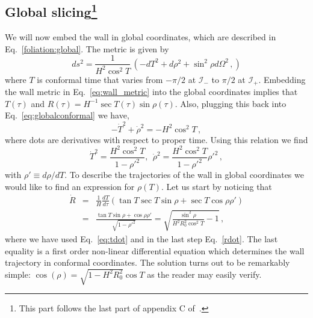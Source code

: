 \documentclass[a4paper,11pt]{article}
\numberwithin{equation}{section}
\begin{document}
\subsection*{Global slicing\footnote{This part follows the last part of appendix C of~\cite{Blau:1986cw}.}}
We will now embed the wall in global coordinates, which are described in Eq.~\eqref{foliation:global}. The metric is given by
\begin{equation}
 ds^2=\frac{1}{H^2\cos^2T}\, \left(-dT^2+d\rho^2+\sin^2\rho d\Omega^2 \,, \label{eq:globalconformal}
\right)
\end{equation}
where $T$ is conformal time that varies from $-\pi/2$ at $\mathscr{I}_-$ to  $\pi/2$ at $\mathscr{I}_+$.  Embedding the wall metric in Eq.~\eqref{eq:wall_metric} into the global coordinates implies that $T(\tau)$ and $R(\tau)=H^{-1}\sec T(\tau)\sin\rho(\tau)$.  Also, plugging this back into Eq.~\eqref{eq:globalconformal} we have,
\begin{equation}
-\dot T^2+\dot\rho^2=-H^2\cos^2 T \,,
\end{equation}
where dots are derivatives with respect to proper time. Using this relation we find
\begin{equation}
\dot T^2=\frac{H^2\cos ^2T}{1-\rho'^2},~~\dot {\rho}^2=\frac{H^2\cos ^2T}{1-\rho'^2}\rho '^2 \,, \label{eq:tdot}
\end{equation}
with $\rho'\equiv d\rho/d T$. To describe the trajectories of the wall in  global coordinates we would like to find an expression for  $\rho(T)$.  Let us start by noticing that
\begin{eqnarray}
\dot R&=&\frac{1}{H} \frac{d T}{d\tau}\left(\tan T\sec T \sin\rho+\sec T\cos\rho \rho' \right)\nonumber\\
&=& \frac{\tan T\sin\rho+\cos\rho\rho'}{\sqrt{1-\rho'^2}}=\sqrt{\frac{\sin^2{\rho}}{H^2R_0^2\cos^2T}-1} \,,
\end{eqnarray}
where we have  used Eq.~\eqref{eq:tdot} and in the last step Eq.~\eqref{rdot}. The last equality is a first order non-linear differential equation which determines the wall trajectory in conformal coordinates. The solution turns out to be remarkably simple: $\cos(\rho)=\sqrt{1-H^2R_0^2}\cos T \label{eq:sol1}$ as the reader may easily verify. 
\end{document}
